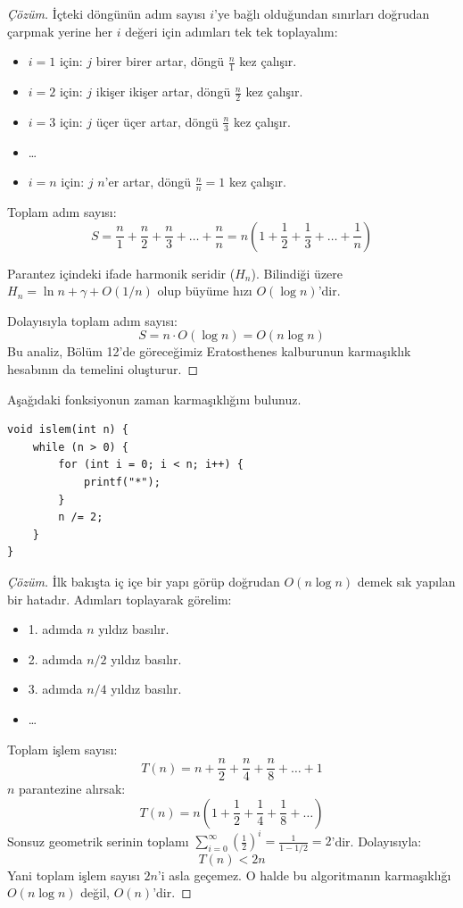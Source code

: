 \begin{proof}[Çözüm]
İçteki döngünün adım sayısı $i$'ye bağlı olduğundan sınırları doğrudan çarpmak yerine her $i$ değeri için adımları tek tek toplayalım:

\begin{itemize}
    \item $i = 1$ için: $j$ birer birer artar, döngü $\frac{n}{1}$ kez çalışır.
    \item $i = 2$ için: $j$ ikişer ikişer artar, döngü $\frac{n}{2}$ kez çalışır.
    \item $i = 3$ için: $j$ üçer üçer artar, döngü $\frac{n}{3}$ kez çalışır.
    \item \dots
    \item $i = n$ için: $j$ $n$'er artar, döngü $\frac{n}{n} = 1$ kez çalışır.
\end{itemize}

Toplam adım sayısı:
\[ S = \frac{n}{1} + \frac{n}{2} + \frac{n}{3} + \dots + \frac{n}{n} = n \left( 1 + \frac{1}{2} + \frac{1}{3} + \dots + \frac{1}{n} \right) \]

Parantez içindeki ifade harmonik seridir ($H_n$). Bilindiği üzere $H_n = \ln n + \gamma + O(1/n)$ olup büyüme hızı $O(\log n)$'dir. 

Dolayısıyla toplam adım sayısı:
\[ S = n \cdot O(\log n) = O(n \log n) \]
Bu analiz, Bölüm 12'de göreceğimiz Eratosthenes kalburunun karmaşıklık hesabının da temelini oluşturur.
\end{proof}

\begin{example}
Aşağıdaki fonksiyonun zaman karmaşıklığını bulunuz.

\begin{lstlisting}[language=CTemel]
void islem(int n) {
    while (n > 0) {
        for (int i = 0; i < n; i++) {
            printf("*");
        }
        n /= 2;
    }
}
\end{lstlisting}
\end{example}

\begin{proof}[Çözüm]
İlk bakışta iç içe bir yapı görüp doğrudan $O(n \log n)$ demek sık yapılan bir hatadır. Adımları toplayarak görelim:
\begin{itemize}
    \item 1. adımda $n$ yıldız basılır.
    \item 2. adımda $n / 2$ yıldız basılır.
    \item 3. adımda $n / 4$ yıldız basılır.
    \item \dots
\end{itemize}
Toplam işlem sayısı:
\[ T(n) = n + \frac{n}{2} + \frac{n}{4} + \frac{n}{8} + \dots + 1 \]
$n$ parantezine alırsak:
\[ T(n) = n \left( 1 + \frac{1}{2} + \frac{1}{4} + \frac{1}{8} + \dots \right) \]
Sonsuz geometrik serinin toplamı $\sum_{i=0}^{\infty} \left(\frac{1}{2}\right)^i = \frac{1}{1 - 1/2} = 2$'dir.
Dolayısıyla:
\[ T(n) < 2n \]
Yani toplam işlem sayısı $2n$'i asla geçemez. O halde bu algoritmanın karmaşıklığı $O(n \log n)$ değil, \textbf{$O(n)$}'dir.
\end{proof}

